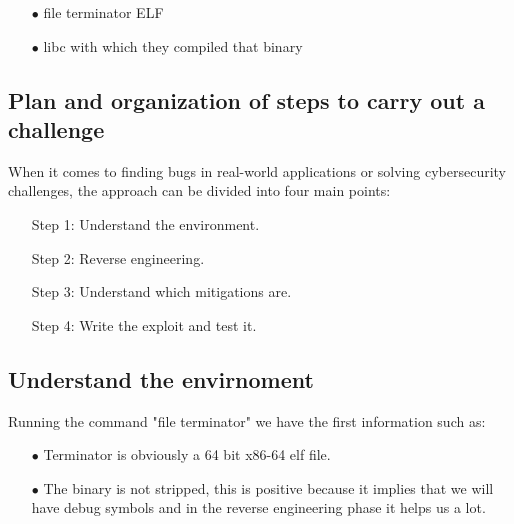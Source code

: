     \begin{itemize}
        \item[$\bullet$] file terminator ELF  
        \item[$\bullet$] libc with which they compiled that binary
    \end{itemize}
    \clearpage
    
    \subsection{Plan and organization of steps to carry out a challenge}
    When it comes to finding bugs in real-world applications or solving cybersecurity challenges, the approach can be divided into four main points: \newline
    \begin{itemize}
        \item[Step 1:] Understand the environment.
        \item[Step 2:] Reverse engineering.
        \item[Step 3:] Understand which mitigations are.
        \item[Step 4:] Write the exploit and test it.
    \end{itemize}

    \subsection{Understand the envirnoment}
    Running the command "file terminator"  we have the first information such as:\newline
    \begin{itemize}
        \item[$\bullet$] Terminator is obviously a 64 bit x86-64 elf file.
        \item[$\bullet$] The binary is not stripped, this is positive because it implies that we will have debug symbols and in the reverse engineering phase it helps us a lot.
    \end{itemize}
